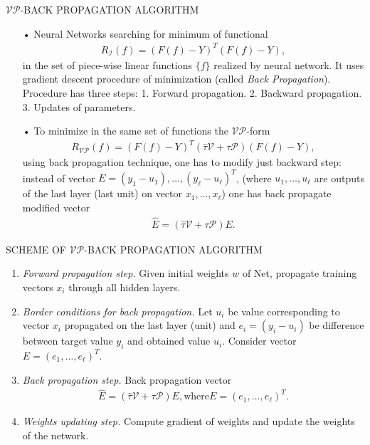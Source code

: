 \documentclass[11pt]{beamer}
\begin{document}
\begin{frame}{$\mathcal{VP}$-BACK PROPAGATION ALGORITHM}
\begin{enumerate}
\item[•] Neural Networks searching for minimum of functional
\begin{align*}
R_{\mathcal{I}}(f) = (F(f) - Y)^{T}(F(f) - Y),
\end{align*}
in the set of piece-wise linear functions $\{f\}$ realized by neural network. It uses gradient descent procedure of minimization (called \emph{Back Propagation}). Procedure has three steps: 1. Forward propagation. 2. Backward propagation. 3. Updates of parameters.
\item[•] To minimize in the same set of functions the $\mathcal{VP}$-form
\begin{align*}
R_{\mathcal{VP}}(f) = (F(f) - Y)^{T}(\hat{\tau}\mathcal{V} + \tau\mathcal{P})(F(f) - Y),
\end{align*}
using back propagation technique, one has to modify just backward step: instead of vector $E = (y_{1}-u_{1}), \ldots, (y_{\ell}-u_{\ell})^{T}$, (where $u_{1}, \ldots, u_{\ell}$ are outputs of the last layer (last unit) on vector $x_{1}, \ldots, x_{\ell}$) one has back propagate modified vector
\begin{align*}
\hat{E} = (\hat{\tau}\mathcal{V} + \tau\mathcal{P})E.
\end{align*}
\end{enumerate}
\end{frame}


\begin{frame}{SCHEME OF $\mathcal{VP}$-BACK PROPAGATION ALGORITHM}
\begin{enumerate}
\item \emph{Forward propagation step.} Given initial weights $w$ of Net,  propagate training vectors $x_{i}$ through all hidden layers.
\item \emph{Border conditions for back propagation.} Let $u_{i}$ be value corresponding to vector $x_{i}$ propagated on the last layer (unit) and $e_{i} = (y_{i} - u_{i})$ be difference between target value $y_{i}$ and obtained value $u_{i}$. Consider vector $E = (e_{1}, \ldots, e_{\ell})^{T}$.
\item \emph{Back propagation step.} Back propagation vector
\begin{align*}
\hat{E} = (\hat{\tau}\mathcal{V} + \tau\mathcal{P})E, \text{where} E = (e_{1}, \ldots, e_{\ell})^{T}.
\end{align*}
\item \emph{Weights updating step.} Compute gradient of weights and update the weights of the network.
\end{enumerate}
\end{frame}
\end{document}
